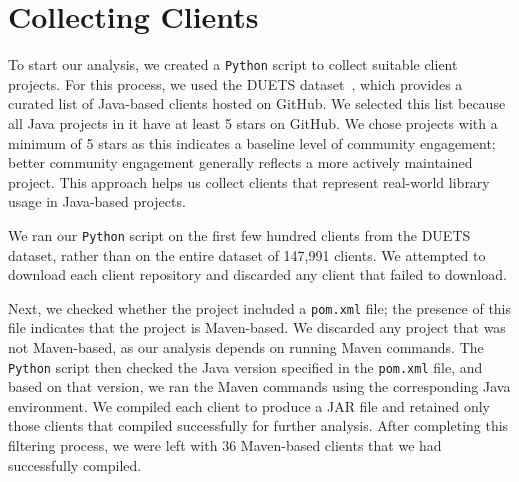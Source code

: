 \section{Collecting Clients}


To start our analysis, we created a \texttt{Python} script to collect suitable client projects. For this process, we used the DUETS dataset~\cite{durieux21:_duets}, which provides a curated list of Java-based clients hosted on GitHub. We selected this list because all Java projects in it have at least 5 stars on GitHub. We chose projects with a minimum of 5 stars as this indicates a baseline level of community engagement; better community engagement generally reflects a more actively maintained project. This approach helps us collect clients that represent real-world library usage in Java-based projects.



We ran our \texttt{Python} script on the first few hundred clients from the DUETS dataset, rather than on the entire dataset of 147,991 clients. We attempted to download each client repository and discarded any client that failed to download. 

Next, we checked whether the project included a \texttt{pom.xml} file; the presence of this file indicates that the project is Maven-based. We discarded any project that was not Maven-based, as our analysis depends on running Maven commands. The \texttt{Python} script then checked the Java version specified in the \texttt{pom.xml} file, and based on that version, we ran the Maven commands using the corresponding Java environment. We compiled each client to produce a JAR file and retained only those clients that compiled successfully for further analysis. After completing this filtering process, we were left with 36 Maven-based clients that we had successfully compiled.


